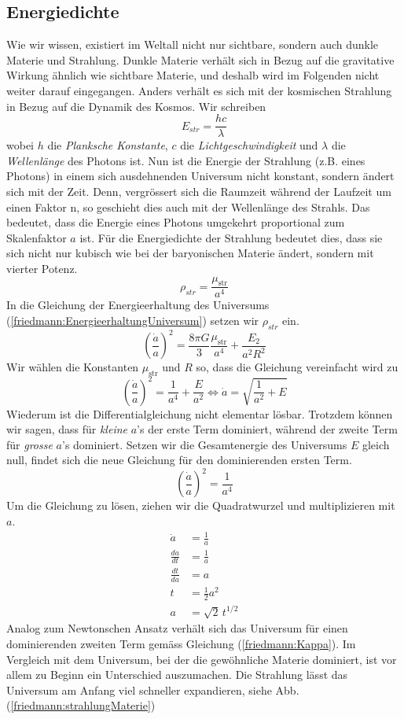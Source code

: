 \begin{refsection}
\subsection*{Energiedichte}
Wie wir wissen, existiert im Weltall nicht nur sichtbare, sondern auch dunkle Materie und Strahlung. Dunkle Materie verhält sich in Bezug auf die gravitative Wirkung ähnlich wie sichtbare Materie, und deshalb wird im Folgenden nicht weiter darauf eingegangen.
Anders verhält es sich mit der kosmischen Strahlung in Bezug auf die Dynamik des Kosmos. Wir schreiben
\[ E_{str} = \frac{h c}{\lambda} \]
wobei $h$ die {\em Planksche Konstante}, $c$ die {\em Lichtgeschwindigkeit} und $\lambda$ die {\em Wellenlänge} des Photons ist.
Nun ist die Energie der Strahlung (z.B. eines Photons) in einem sich ausdehnenden Universum nicht konstant, sondern ändert sich mit der Zeit. 
Denn, vergrössert sich die Raumzeit während der Laufzeit um einen Faktor n, so geschieht dies auch mit der Wellenlänge des Strahls. Das bedeutet, dass die Energie eines Photons umgekehrt proportional zum Skalenfaktor $a$ ist. Für die Energiedichte der Strahlung bedeutet dies, dass sie sich nicht nur kubisch wie bei der baryonischen Materie ändert, sondern mit vierter Potenz.
\begin{equation}
\rho_{str} = \frac{\mu_{\text{str}}}{a^4}
\end{equation}
In die Gleichung der Energieerhaltung des Universums (\ref{friedmann:EnergieerhaltungUniversum}) setzen wir $\rho_{str}$ ein.
\[\left(\frac{\dot{a}}{a} \right)^2 = \frac{8 \pi G}{3} \frac{\mu_{\text{str}}}{a^4} + \frac{E_2}{a^2 R^2}\]
Wir wählen die Konstanten $\mu_{\text{str}}$ und $R$ so, dass die Gleichung vereinfacht wird zu
\[\left(\frac{\dot{a}}{a} \right)^2 = \frac{1}{a^4} + \frac{E}{a^2} \Leftrightarrow \dot{a} = \sqrt{\frac{1}{a^2} + E}\]
Wiederum ist die Differentialgleichung nicht elementar lösbar. Trotzdem können wir sagen, dass für {\em kleine} $a$'s der erste Term dominiert, während der zweite Term für {\em grosse} $a$'s dominiert. Setzen wir die Gesamtenergie des Universums $E$ gleich null, findet sich die neue Gleichung für den dominierenden ersten Term.	
\[\left(\frac{\dot{a}}{a} \right)^2 = \frac{1}{a^4}\]
Um die Gleichung zu lösen, ziehen wir die Quadratwurzel und multiplizieren mit $a$.
\begin{align}
	\nonumber\dot{a} &= \frac{1}{a} \\
	\nonumber\frac{da}{dt} &=\frac{1}{a} \\
	\nonumber\frac{dt}{da} &= a\\
	\nonumber t &= \frac{1}{2} a^{2}\\
	a &= \sqrt{2}\,t^{1/2} 
\end{align}
Analog zum Newtonschen Ansatz verhält sich das Universum für einen dominierenden zweiten Term gemäss Gleichung (\ref{friedmann:Kappa}). 
Im Vergleich mit dem Universum, bei der die gewöhnliche Materie dominiert, ist vor allem zu Beginn ein Unterschied auszumachen. Die Strahlung lässt das Universum am Anfang viel schneller expandieren, siehe Abb. (\ref{friedmann:strahlungMaterie}) 


\end{refsection}
